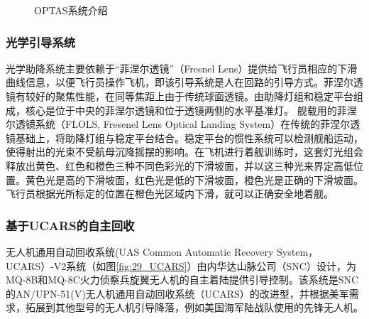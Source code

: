 \begin{figure}[htb]
	\centering%
	\hspace{4em}%
	\caption{OPTAS系统介绍}
	\label{fig:15_OPTAS}
\end{figure}


\subsubsection{光学引导系统}
光学助降系统主要依赖于“菲涅尔透镜”（Fresnel Lens）提供给飞行员相应的下滑曲线信息，以便飞行员操作飞机，即该引导系统是人在回路的引导方式。菲涅尔透镜有较好的聚焦性能，在同等焦距上由于传统球面透镜。由助降灯组和稳定平台组成，核心是位于中央的菲涅尔透镜和位于透镜两侧的水平基准灯。	舰载用的菲涅尔透镜系统（FLOLS, Fresenel Lens Optical Landing System）在传统的菲涅尔透镜基础上，将助降灯组与稳定平台结合。稳定平台的惯性系统可以检测舰船运动，使得射出的光束不受航母沉降摇摆的影响。在飞机进行着舰训练时，这套灯光组会释放出黄色、红色和橙色三种不同色彩光的下滑坡面，并以这三种光来界定高低位置。黄色光是高的下滑坡面，红色光是低的下滑坡面，橙色光是正确的下滑坡面。飞行员根据光所标定的位置在橙色光区域内下滑，就可以正确安全地着舰。


\subsubsection{基于UCARS的自主回收}
无人机通用自动回收系统(UAS Common Automatic Recovery System，UCARS）-V2系统（如图\ref{fig:29_UCARS}）由内华达山脉公司（SNC）设计，为MQ-8B和MQ-8C火力侦察兵旋翼无人机的自主着陆提供引导控制。该系统是SNC的AN/UPN-51(V)无人机通用自动回收系统（UCARS）的改进型，并根据美军需求，拓展到其他型号的无人机引导降落，例如美国海军陆战队使用的先锋无人机。

